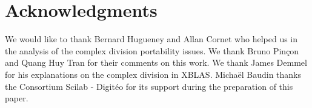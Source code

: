\documentclass{paper}
\begin{document}
\section*{Acknowledgments}

We would like to thank Bernard Hugueney and Allan Cornet who helped 
us in the analysis of the complex division portability issues. 
We thank Bruno Pin\c{c}on and Quang Huy Tran for their comments on this 
work. 
We thank James Demmel for his explanations on the complex 
division in XBLAS. 
Micha\"el Baudin thanks the Consortium Scilab - Digit\'eo for its 
support during the preparation of this paper.



\end{document}
